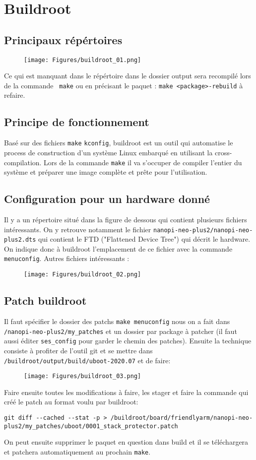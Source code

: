 \section{Buildroot}
\subsection{Principaux répértoires}
\begin{figure}[H]
\centering
\texttt{[image: Figures/buildroot\_01.png]}
\end{figure}
Ce qui est manquant dans le répértoire dans le dossier output sera recompilé lors de la commande \verb! make! ou en précisant le paquet : \verb!make <package>-rebuild! à refaire.
\subsection{Principe de fonctionnement}
Basé sur des fichiers \verb!make! \verb!kconfig!, buildroot est un outil qui automatise le process de construction d'un système Linux embarqué en utilisant la cross-compilation. Lors de la commande \verb!make! il va s'occuper de compiler l'entier du système et préparer une image complète et prête pour l'utilisation.
\subsection{Configuration pour un hardware donné}
Il y a un répertoire situé dans la figure de dessous qui contient plusieurs fichiers intéressants. On y retrouve notamment le fichier \verb!nanopi-neo-plus2/nanopi-neo-plus2.dts! qui contient le FTD ("Flattened Device Tree") qui décrit le hardware. On indique donc à buildroot l'emplacement de ce fichier avec la commande \verb!menuconfig!. Autres fichiers intéressants : 
\begin{figure}[H]
\centering
\texttt{[image: Figures/buildroot\_02.png]}
\end{figure}
\subsection{Patch buildroot}
Il faut spécifier le dossier des patchs \verb!make menuconfig! nous on a fait dans \verb!/nanopi-neo-plus2/my_patches! et un dossier par package à patcher (il faut aussi éditer \verb!ses_config! pour garder le chemin des patches). Ensuite la technique consiste à profiter de l'outil git et se mettre dans \verb!/buildroot/output/build/uboot-2020.07! et de faire:
\begin{figure}[H]
\centering
\texttt{[image: Figures/buildroot\_03.png]}
\end{figure}
Faire ensuite toutes les modifications à faire, les stager et faire la commande qui créé le patch au format voulu par buildroot:
\begin{lstlisting}[style=bash]
git diff --cached --stat -p > /buildroot/board/friendlyarm/nanopi-neo-plus2/my_patches/uboot/0001_stack_protector.patch
\end{lstlisting}
On peut ensuite supprimer le paquet en question dans build et il se téléchargera et patchera automatiquement au prochain \verb!make!.
